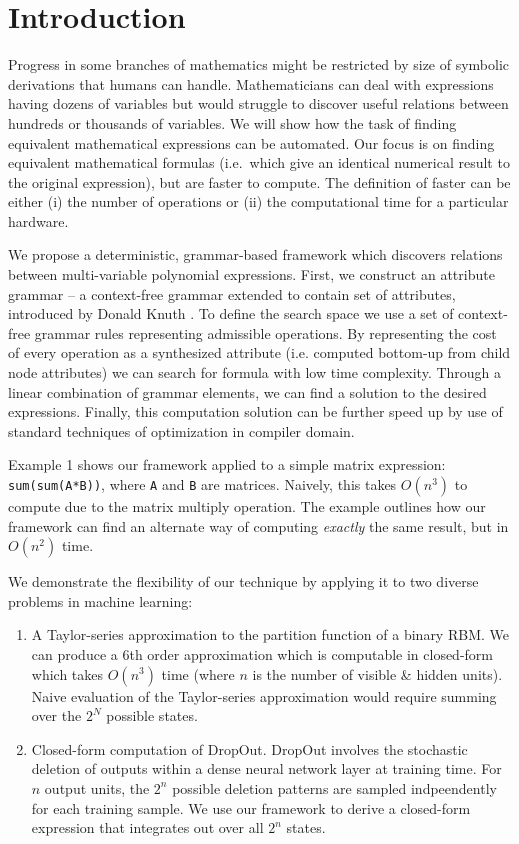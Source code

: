 \section{Introduction} \label{introduction} 

Progress in some branches of
mathematics might be restricted by size of symbolic derivations that humans can
handle. Mathematicians can deal with expressions having dozens of
variables but would struggle to discover useful relations between hundreds or
thousands of variables. We will show how the task of finding equivalent
mathematical expressions can be automated. Our focus is on finding equivalent
mathematical formulas (i.e.~which give an identical numerical result
to the original expression),
but are faster to compute. The definition
of faster can be either (i) the number of operations or (ii) the computational time
for a particular hardware.

We propose a deterministic, grammar-based framework which discovers
relations between multi-variable polynomial expressions. First, we
construct an attribute grammar -- a context-free grammar extended to
contain set of attributes, introduced by Donald Knuth
\cite{knuth1968semantics}. To define the search space we use a set of
context-free grammar rules representing admissible operations. By
representing the cost of every operation as a synthesized attribute
(i.e. computed bottom-up from child node attributes) we can search for
formula with low time complexity. Through a linear combination of
grammar elements, we can find a solution to the desired
expressions. Finally, this computation solution can be further speed
up by use of standard techniques of optimization in compiler
domain. 

Example 1 shows our framework applied to a simple matrix expression:
\texttt{sum(sum(A*B))}, where \texttt{A} and \texttt{B} are matrices. Naively, this takes $O(n^3)$ to compute due to
the matrix multiply operation. The example outlines how our framework
can find an alternate way of computing {\em exactly} the same result,
but in $O(n^2)$ time.  

We demonstrate the flexibility of our technique by applying it to two
diverse problems in machine learning: 
\begin{enumerate}
\vspace{-2mm}
\item A Taylor-series approximation to the partition function of a
  binary RBM. We can produce a 6th order approximation which is
  computable in closed-form which takes $O(n^3)$ time (where $n$ is the
  number of visible \& hidden units). Naive evaluation of the Taylor-series
  approximation would require summing over the $2^N$ possible states.   
\item Closed-form computation of DropOut. DropOut \cite{Hinton12}
  involves the  stochastic deletion of outputs within a dense neural
  network layer at training time. For $n$ output units, the $2^n$
  possible deletion patterns are sampled indpeendently for each
  training sample. We use our framework to derive a closed-form
  expression that integrates out over all $2^n$ states.  
\end{enumerate}
\vspace{-2mm}


